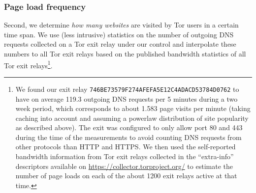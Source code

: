 \subsubsection{Page load frequency}
Second, we determine \emph{how many websites} are visited by Tor users in a
certain time span. We use (less intrusive) statistics on the number of
outgoing DNS requests collected on a Tor exit relay under our control
and interpolate these numbers to all Tor exit relays based on the
published bandwidth statistics of all Tor exit relays\footnote{We found
		our exit relay \texttt{746BE73579F274AFEFA5E12C4ADACD53784D0762}
		to have on average 119.3 outgoing DNS requests per 5 minutes
		during a two week period, which corresponds to about 1.583 page
		visits per minute (taking caching into account and assuming a
		powerlaw distribution of site popularity as described above).
		The exit was configured to only allow port 80 and 443 during the
		time of the measurements to avoid counting DNS requests from
		other protocols than HTTP and HTTPS. We then used the
		self-reported bandwidth information from Tor exit relays
		collected in the ``extra-info'' descriptors available on
		\url{https://collector.torproject.org/} to estimate the number
		of page loads on each of the about 1200 exit relays active at
		that time.}.

